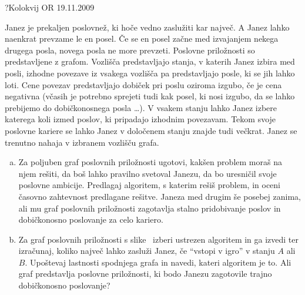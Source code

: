 \begin{naloga}{?}{Kolokvij OR 19.11.2009}
\begin{vprasanje}[poslovnez]
Janez je prekaljen poslovnež, ki hoče vedno zaslužiti kar največ.
A Janez lahko naenkrat prevzame le en posel.
Če se en posel začne med izvajanjem nekega drugega posla,
novega posla ne more prevzeti.
Poslovne priložnosti so predstavljene z grafom.
Vozlišča predstavljajo stanja, v katerih Janez izbira med posli,
izhodne povezave iz vsakega vozlišča pa predstavljajo posle,
ki se jih lahko loti.
Cene povezav predstavljajo dobiček pri poslu oziroma izgubo,
če je cena negativna
(včasih je potrebno sprejeti tudi kak posel, ki nosi izgubo,
da se lahko prebijemo do dobičkonosnega posla \dots).
V vsakem stanju lahko Janez izbere katerega koli izmed poslov,
ki pripadajo izhodnim povezavam.
Tekom svoje poslovne kariere se lahko Janez
v določenem stanju znajde tudi večkrat.
Janez se trenutno nahaja v izbranem vozlišču grafa.
\begin{enumerate}[(a)]
\item Za poljuben graf poslovnih priložnosti ugotovi,
kakšen problem moraš na njem rešiti, da boš lahko pravilno svetoval Janezu,
da bo uresničil svoje poslovne ambicije.
Predlagaj algoritem, s katerim rešiš problem,
in oceni časovno zahtevnost predlagane rešitve.
Janeza med drugim še posebej zanima,
ali mu graf poslovnih priložnosti zagotavlja stalno pridobivanje poslov
in dobičkonosno poslovanje za celo kariero.
\item Za graf poslovnih priložnosti s slike~\fig{}
izberi ustrezen algoritem in ga izvedi ter izračunaj,
koliko največ lahko zasluži Janez, če ``vstopi v igro'' v stanju $A$ ali $B$.
Upoštevaj lastnosti spodnjega grafa in navedi, kateri algoritem je to.
Ali graf predstavlja poslovne priložnosti,
ki bodo Janezu zagotovile trajno dobičkonosno poslovanje?
\end{enumerate}

\begin{slika}
\pgfslika
{}
\end{slika}
\end{vprasanje}
\begin{odgovor}
\end{odgovor}
\end{naloga}


